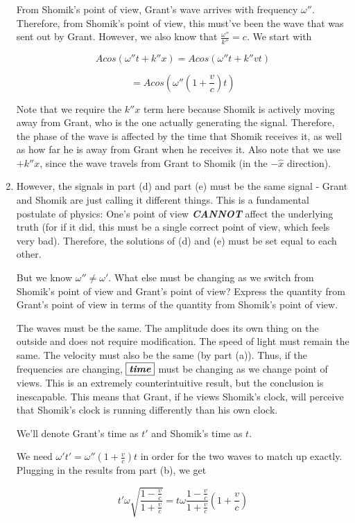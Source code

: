 \documentclass{article}
\begin{document}
\begin{enumerate}[label=(\alph*)]
    From Shomik's point of view, Grant's wave arrives with frequency $\omega''$. Therefore, from Shomik's point of view, this must've been the wave that was sent out by Grant. However, we also know that $\frac{\omega''}{k''} = c$. We start with

    $$Acos(\omega''t + k''x) = Acos(\omega''t + k''vt)$$
    
    $$\boxed{= Acos(\omega'' \left(1 + \frac{v}{c} \right) t)}$$

    Note that we require the $k''x$ term here because Shomik is actively moving away from Grant, who is the one actually generating the signal. Therefore, the phase of the wave is affected by the time that Shomik receives it, as well as how far he is away from Grant when he receives it. Also note that we use $+k''x$, since the wave travels from Grant to Shomik (in the $-\hat{x}$ direction).
    
    \item However, the signals in part (d) and part (e) must be the same signal - Grant and Shomik are just calling it different things. This is a fundamental postulate of physics: One's point of view \textbf{\textit{CANNOT}} affect the underlying truth (for if it did, this must be a single correct point of view, which feels very bad). Therefore, the solutions of (d) and (e) must be set equal to each other.

    But we know $\omega'' \neq \omega'$. What else must be changing as we switch from Shomik's point of view and Grant's point of view? Express the quantity from Grant's point of view in terms of the quantity from Shomik's point of view.

    The waves must be the same. The amplitude does its own thing on the outside and does not require modification. The speed of light must remain the same. The velocity must also be the same (by part (a)). Thus, if the frequencies are changing, $\boxed{\textbf{\textit{time}}}$ must be changing as we change point of views. This is an extremely counterintuitive result, but the conclusion is inescapable. This means that Grant, if he views Shomik's clock, will perceive that Shomik's clock is running differently than his own clock.
    
    We'll denote Grant's time as $t'$ and Shomik's time as $t$.

    We need $\omega't' = \omega''\left(1 + \frac{v}{c} \right)t$ in order for the two waves to match up exactly. Plugging in the results from part (b), we get

    $$t' \omega \sqrt{\frac{1 - \frac{v}{c}}{1 + \frac{v}{c}}} = t \omega \frac{1 - \frac{v}{c}}{1 + \frac{v}{c}}\left(1 + \frac{v}{c} \right)$$


\end{enumerate}
\end{document}
